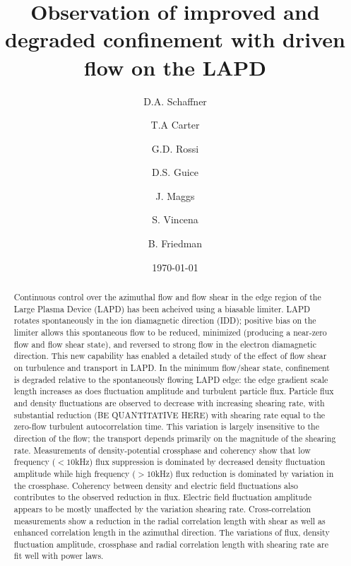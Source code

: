 \documentclass[%
 aps,
 prl,
 amsmath,amssymb,
 reprint,%
]{revtex4-1}
\begin{document}
\title{Observation of improved and degraded confinement with driven flow on the LAPD}
\author{D.A. Schaffner}
\author{T.A Carter}
\author{G.D. Rossi}
\author{D.S. Guice}
\author{J. Maggs}
\author{S. Vincena}
\author{B. Friedman}

\date{\today}%

\begin{abstract}
Continuous control over the azimuthal flow and flow shear in the edge
region of the Large Plasma Device (LAPD) has been acheived using a
biasable limiter.  LAPD rotates spontaneously in the ion diamagnetic
direction (IDD); positive bias on the limiter allows this spontaneous
flow to be reduced, minimized (producing a near-zero flow and flow
shear state), and reversed to strong flow in the electron diamagnetic direction.  This new capability has enabled a
detailed study of the effect of flow shear on turbulence and transport
in LAPD.  In the minimum flow/shear state, confinement is degraded
relative to the spontaneously flowing LAPD edge:  the edge gradient scale
length increases as does fluctuation amplitude and turbulent particle
flux.  Particle flux and density fluctuations
are observed to decrease with increasing shearing rate, with
substantial reduction (BE QUANTITATIVE HERE) with shearing rate equal
to the zero-flow turbulent autocorrelation time.  This
variation is largely insensitive to the direction of the flow; the
transport depends primarily on the magnitude of the shearing rate. 
Measurements of density-potential crossphase and coherency show
that low frequency ($<10$kHz) flux suppression is dominated by
decreased density fluctuation amplitude while high frequency ($>10$kHz) flux reduction
is dominated by variation in the crossphase. Coherency between density and
electric field fluctuations also contributes to the observed reduction
in flux.  Electric field fluctuation amplitude appears to be mostly unaffected
by the variation shearing rate. Cross-correlation measurements show a reduction in
the radial correlation length with shear as well as enhanced
correlation length in the azimuthal direction.   The variations of
flux, density fluctuation amplitude, crossphase and radial correlation
length with shearing rate are fit well with power laws.



\end{abstract}
\end{document}
